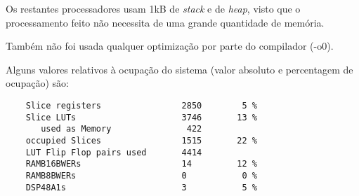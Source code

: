 Os restantes processadores usam 1kB de \textit{stack} e de \textit{heap}, visto que o processamento feito não necessita de uma grande quantidade de memória.

Também não foi usada qualquer optimização por parte do compilador (-o0).

Alguns valores relativos à ocupação do sistema (valor absoluto e percentagem de ocupação) são:


\begin{verbatim}
    Slice registers                2850        5 %
    Slice LUTs                     3746       13 %
       used as Memory               422
    occupied Slices                1515       22 %
    LUT Flip Flop pairs used       4414
    RAMB16BWERs                    14         12 %
    RAMB8BWERs                     0           0 %
    DSP48A1s                       3           5 %
\end{verbatim}

